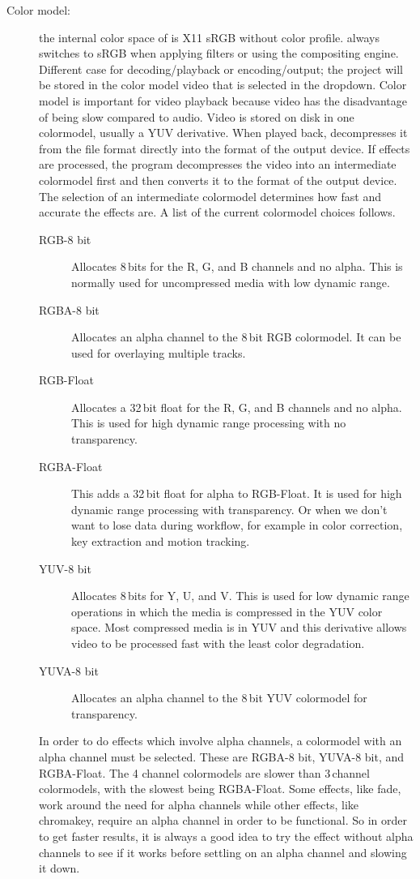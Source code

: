 \begin{description}
\item[Color model:] the internal color space of \CGG{} is X11 sRGB
without color profile. \CGG{} always switches to sRGB when applying
filters or using the compositing engine. Different case for
decoding/playback or encoding/output; the project will be stored in
the color model video that is selected in the dropdown.  Color model
is important for video playback because video has the disadvantage
of being slow compared to audio.  Video is stored on disk in one
colormodel, usually a YUV derivative.  When played back, \CGG{}
decompresses it from the file format directly into the format of the
output device.  If effects are processed, the program decompresses
the video into an intermediate colormodel first and then converts it
to the format of the output device.  The selection of an
intermediate colormodel determines how fast and accurate the effects
are.  A list of the current colormodel choices follows.

  \begin{description}
  \item[RGB-8 bit] Allocates 8\,bits for the R, G, and B channels
and no alpha. This is normally used for uncompressed media with low
dynamic range.
  \item[RGBA-8 bit] Allocates an alpha channel to the 8\,bit RGB
colormodel. It can be used for overlaying multiple tracks.
  \item[RGB-Float] Allocates a 32\,bit float for the R, G, and B
channels and no alpha. This is used for high dynamic range
processing with no transparency.
  \item[RGBA-Float] This adds a 32\,bit float for alpha to
RGB-Float. It is used for high dynamic range processing with
transparency. Or when we don't want to lose data during workflow,
for example in color correction, key extraction and motion
tracking.
  \item[YUV-8 bit] Allocates 8\,bits for Y, U, and V. This is used
for low dynamic range operations in which the media is compressed in
the YUV color space. Most compressed media is in YUV and this
derivative allows video to be processed fast with the least color
degradation.
  \item[YUVA-8 bit] Allocates an alpha channel to the 8\,bit YUV
colormodel for transparency.
  \end{description} In order to do effects which involve alpha
channels, a colormodel with an alpha channel must be selected.
These are RGBA-8 bit, YUVA-8 bit, and RGBA-Float.  The 4 channel
colormodels are slower than 3\,channel colormodels, with the slowest
being RGBA-Float.  Some effects, like fade, work around the need for
alpha channels while other effects, like chromakey, require an alpha
channel in order to be functional.  So in order to get faster
results, it is always a good idea to try the effect without alpha
channels to see if it works before settling on an alpha channel and
slowing it down.


\end{description}
